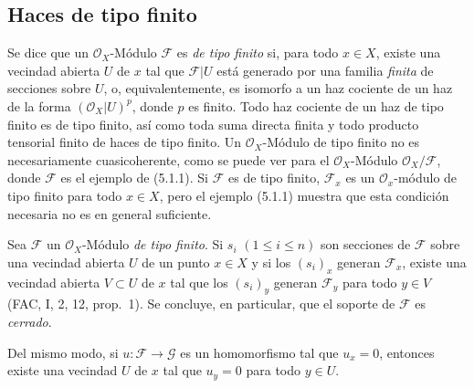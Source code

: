 \subsection{Haces de tipo finito}
\label{subsection:0.5.2-fr}

\begin{env}[5.2.1]
\label{0.5.2.1-fr}
Se dice que un $\mathcal{O}_X$-Módulo $\mathcal{F}$ es \emph{de tipo finito} si,
para todo $x\in X$, existe una vecindad abierta $U$ de $x$ tal que
$\mathcal{F}|U$ está generado por una familia \emph{finita} de secciones
sobre $U$, o, equivalentemente, es isomorfo a un haz cociente de un
haz de la forma $(\mathcal{O}_X|U)^p$, donde $p$ es finito. Todo haz
cociente de un haz de tipo finito es de tipo finito, así como toda suma
directa finita y todo producto tensorial finito de haces de tipo finito. Un
$\mathcal{O}_X$-Módulo de tipo finito no es necesariamente cuasicoherente,
como se puede ver para el $\mathcal{O}_X$-Módulo
$\mathcal{O}_X/\mathcal{F}$, donde $\mathcal{F}$ es el ejemplo de (5.1.1). Si
$\mathcal{F}$ es de tipo finito, $\mathcal{F}_x$ es un
$\mathcal{O}_x$-módulo de tipo finito para todo $x\in X$, pero el ejemplo
(5.1.1) muestra que esta condición necesaria no es en general
suficiente.
\end{env}

\begin{env}[5.2.2]
\label{0.5.2.2-fr}
Sea $\mathcal{F}$ un $\mathcal{O}_X$-Módulo \emph{de tipo finito}. Si $s_i$
$(1\leq i\leq n)$ son secciones de $\mathcal{F}$ sobre una vecindad
abierta $U$ de un punto $x\in X$ y si los $(s_i)_x$ generan
$\mathcal{F}_x$, existe una vecindad abierta $V\subset U$ de $x$ tal que
los $(s_i)_y$ generan $\mathcal{F}_y$ para todo $y\in V$ (FAC, I, 2, 12,
prop.~1). Se concluye, en particular, que el soporte de $\mathcal{F}$ es
\emph{cerrado}.


Del mismo modo, si $u:\mathcal{F}\to\mathcal{G}$ es un homomorfismo tal que
$u_x=0$, entonces existe una vecindad $U$ de $x$ tal que $u_y=0$ para todo
$y\in U$.
\end{env}

